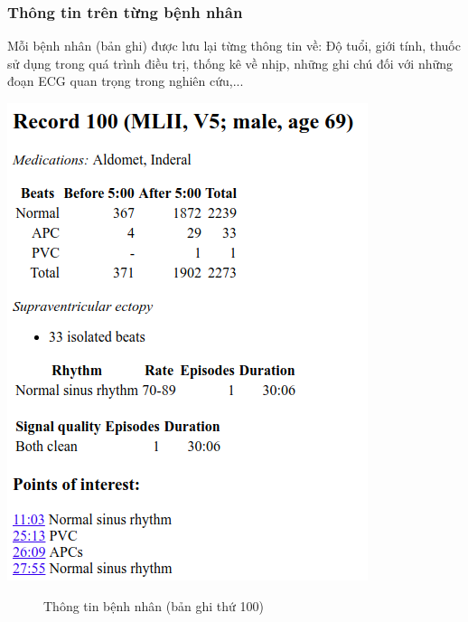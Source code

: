 \subsubsection{Thông tin trên từng bệnh nhân}
Mỗi bệnh nhân (bản ghi) được lưu lại từng thông tin về: Độ tuổi, giới tính, thuốc sử dụng trong quá trình điều trị, thống kê về nhịp, những ghi chú đối với những đoạn ECG quan trọng trong nghiên cứu,...
\begin{center}
    \includegraphics[scale=.4]{image/chapter2/record_info.png}
    \begin{figure}[htp]
    \begin{center}
    \end{center}
    \caption{Thông tin bệnh nhân (bản ghi thứ 100)}
    \end{figure}
\end{center}